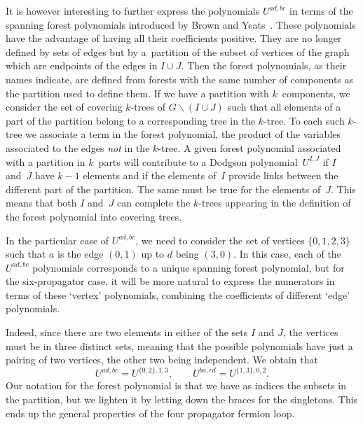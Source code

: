 \documentclass[pdftex]{sigma}
\numberwithin{equation}{section}
\begin{document}
It is however interesting to further express the polynomials $U^{ad,bc}$ in terms of the spanning
forest polynomials introduced by Brown and Yeats~\cite{BrYe09}. These polynomials have the advantage
of having all their coefficients positive. They are no longer defined by sets of edges but by a~partition of the subset of vertices of the graph which are endpoints of the edges in $I\cup J$.
Then the forest polynomials, as their names indicate, are defined from forests with the same number of components as the
partition used to define them. If we have a partition with $k$~components, we consider the set of covering $k$-trees
of $G\backslash(I\cup J)$ such that all elements of a part of the partition belong to a corresponding tree in the $k$-tree. To
each such $k$-tree we associate a term in the forest polynomial, the product of the variables associated to the edges
{\em not} in the $k$-tree. A given forest polynomial associated with a partition in $k$~parts will contribute to a Dodgson
polynomial~$U^{I ,J}$ if $I$ and~$J$ have
$k-1$ elements and if the elements of~$I$ provide links between the different part of the partition. The same must be true for
the elements of~$J$. This means that both $I$ and~$J$ can complete the $k$-trees appearing in the definition of the forest
polynomial into covering trees.

In the particular
case of $U^{ad,bc}$, we need to consider the set of vertices $\{0,1,2,3\}$ such that $a$ is the
edge $(0,1)$ up to $d$ being $(3,0)$. In this case, each of the $U^{ad,bc}$ polynomials
corresponds to a unique spanning forest polynomial, but for the six-propagator case, it will be more
natural to express the numerators in terms of these `vertex' polynomials, combining the coefficients
of different `edge' polynomials.

Indeed, since there are two elements in either of the sets $I$ and $J$, the vertices must be in
three distinct sets, meaning that the possible polynomials have just a pairing of two vertices, the
other two being independent. We obtain that
\[
	U^{ad,bc} = U^{\{0,2\},1,3},\qquad
	U^{ba,cd} = U^{\{1,3\},0,2}.
\]
Our notation for the forest polynomial is that we have as indices the subsets in the partition, but we lighten it by
letting down the braces for the singletons.
This ends up the general properties of the four propagator fermion loop.
\end{document}
